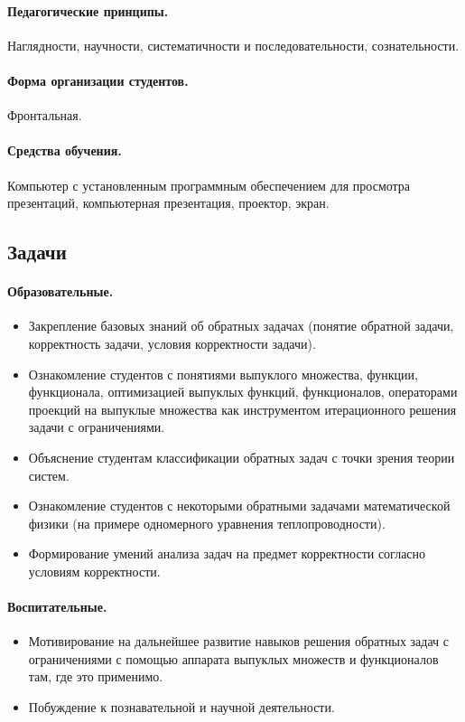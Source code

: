 \begin{refsection}
    \paragraph{Педагогические принципы.} Наглядности, научности, систематичности и последовательности, сознательности.

    \paragraph{Форма организации студентов.} Фронтальная.

    \paragraph{Средства обучения.} Компьютер с установленным программным обеспечением для просмотра презентаций, компьютерная презентация, проектор, экран.

\subsection{Задачи}

    \paragraph{Образовательные.} \begin{itemize}
        \item Закрепление базовых знаний об обратных задачах (понятие обратной задачи, корректность задачи, условия корректности задачи).
        \item Ознакомление студентов с понятиями выпуклого множества, функции, функционала, оптимизацией выпуклых функций, функционалов, операторами проекций на выпуклые множества как инструментом итерационного решения задачи с ограничениями.
        \item Объяснение студентам классификации обратных задач с точки зрения теории систем.
        \item Ознакомление студентов с некоторыми обратными задачами математической физики (на примере одномерного уравнения теплопроводности).
        \item Формирование умений анализа задач на предмет корректности согласно условиям корректности.
    \end{itemize}

    \paragraph{Воспитательные.} \begin{itemize}
        \item Мотивирование на дальнейшее развитие навыков решения обратных задач с ограничениями с помощью аппарата выпуклых множеств и функционалов там, где это применимо.
        \item Побуждение к познавательной и научной деятельности.
    \end{itemize}


\end{refsection}
